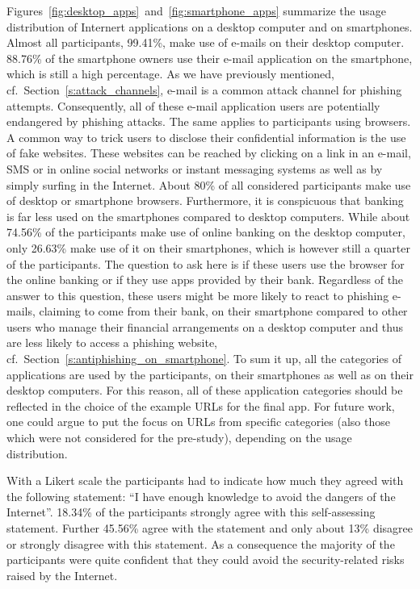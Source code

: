 \begin{description}[leftmargin=0cm]
	\item[Usage Distribution of Internet Applications] Figures~\ref{fig:desktop_apps}~and~\ref{fig:smartphone_apps} summarize the usage distribution of Internert applications on a desktop computer and on smartphones. Almost all participants, 99.41\%, make use of e-mails on their desktop computer. 88.76\% of the smartphone owners use their e-mail application on the smartphone, which is still a high percentage. As we have previously mentioned, cf.~Section~\ref{s:attack_channels}, e-mail is a common attack channel for phishing attempts. Consequently, all of these e-mail application users are potentially endangered by phishing attacks. The same applies to participants using browsers. A common way to trick users to disclose their confidential information is the use of fake websites. These websites can be reached by clicking on a link in an e-mail, SMS or in online social networks or instant messaging systems as well as by simply surfing in the Internet. About 80\% of all considered participants make use of desktop or smartphone browsers. Furthermore, it is conspicuous that banking is far less used on the smartphones compared to desktop computers. While about 74.56\% of the participants make use of online banking on the desktop computer, only 26.63\% make use of it on their smartphones, which is however still a quarter of the participants.	The question to ask here is if these users use the browser for the online banking or if they use apps provided by their bank. Regardless of the answer to this question, these users might be more likely to react to phishing e-mails, claiming to come from their bank, on their smartphone compared to other users who manage their financial arrangements on a desktop computer and thus are less likely to access a phishing website, cf.~Section~\ref{s:antiphishing_on_smartphone}. To sum it up, all the categories of applications are used by the participants, on their smartphones as well as on their desktop computers. For this reason, all of these application categories should be reflected in the choice of the example URLs for the final app. For future work, one could argue to put the focus on URLs from specific categories (also those which were not considered for the pre-study), depending on the usage distribution.

	\item[Self-Assessment - Knowledge to avoid dangers of Internet] With a Likert scale the participants had to indicate how much they agreed with the following statement: ``I have enough knowledge to avoid the dangers of the Internet''. 18.34\% of the participants strongly agree with this self-assessing statement. Further 45.56\% agree with the statement and only about 13\% disagree or strongly disagree with this statement. As a consequence the majority of the participants were quite confident that they could avoid the security-related risks raised by the Internet. 
	

\end{description}
